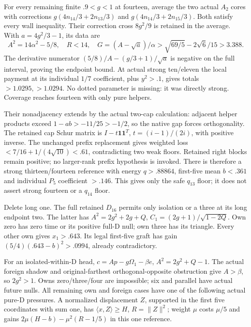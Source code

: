 \documentclass[11pt]{article}
\theoremstyle{definition}
\theoremstyle{remark}
\newcommand{\ip}[2]{\langle #1,#2\rangle}
\newcommand{\norm}[1]{\lVert #1\rVert}
\begin{document}
For every remaining finite \(.9<g<1\) at fourteen, average the
two actual \(A_2\) cores with corrections
\(g(4n_{14}/3+2n_{13}/3)\) and
\(g(4n_{14}/3+2n_{15}/3)\). Both satisfy every wall inequality.
Their correction cross \(8g^2/9\) is retained in the average.
With \(a=4g^2/3-1\), its data are
\[
 A^2=14\alpha^2-5/8,\quad R<14,\quad
 G=(A-\sqrt a)/\alpha>
 \sqrt{69/5}-2\sqrt6/15>3.388.
\]
The derivative numerator \((5/8)/A-(g/3+1)/\sqrt a\) is
negative on the full interval, proving the endpoint bound. At
actual strong ten/eleven the local payment at its individual
\(1/7\) coefficient, plus \(y^2>.1\), gives totals
\(>1.0295,>1.0294\). No dotted parameter is missing: it was
directly strong. Coverage reaches fourteen with only pure helpers.

Their nonadjacency extends by the actual two-cap calculation:
adjacent helper products exceed \(1-ab>-11/25>-1/2\), so
the native gap forces orthogonality. The retained cap Schur matrix
is \(I-t\mathbf1\mathbf1^T\), \(t=(i-1)/(2i)\), with
positive inverse. The unchanged prefix replacement gives weighted
loss \(<7/16+1/(4\sqrt{10})<.61\), contradicting two weak
floors. Retained right blocks remain positive; no larger-rank
prefix hypothesis is invoked.
There is therefore a strong thirteen/fourteen reference with
energy \(q>.88864\), first-five mean \(b<.361\) and individual
\(P_5\) coefficient \(>.146\). This gives only the safe
\(q_{13}\) floor; it does not assert strong fourteen or a
\(q_{14}\) floor.

Delete long one. The full retained \(D_{16}\) permits only
isolation or a three at its long endpoint two. The latter has
\(A^2=2g^2+2g+Q\), \(C_1=(2g+1)/\sqrt{1-2Q}\).
Own zero has zero time or its positive full-D null; own three
has its triangle. Every other own gives \(x_1>.643\).
Its legal first-five graft has gain
\((5/4)(.643-b)^2>.0994\), already contradictory.

For an isolated-within-D head,
\(c=Ap-g\Omega_1-\beta e\), \(A^2=2g^2+Q-1\).
The actual foreign shadow and original-farthest orthogonal-opposite
obstruction give \(A>\beta\), so \(2g^2>1\).
Owns zero/three/four are impossible; six and parallel have actual
future nulls. All remaining own and foreign cases have one of the
following actual pure-D pressures. A normalized displacement
\(Z\), supported in the first five coordinates with sum one,
has \(\ip xZ\ge H\), \(R=\norm Z^2\); weight \(\mu\)
costs \(\mu/5\) and gains
\(2\mu(H-b)-\mu^2(R-1/5)\) in this one reference.
\end{document}
